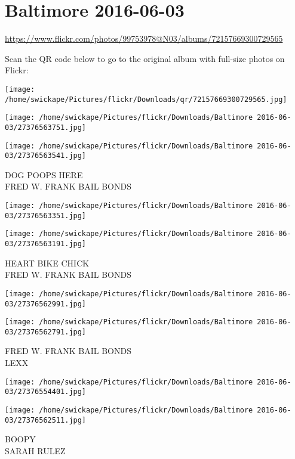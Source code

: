 \documentclass[10pt,letterpaper]{article}
\title{}
\author{}
\date{}
\begin{document}
\section*{Baltimore 2016-06-03}

\url{https://www.flickr.com/photos/99753978@N03/albums/72157669300729565}

Scan the QR code below to go to the original album with full-size photos on Flickr:

\texttt{[image: /home/swickape/Pictures/flickr/Downloads/qr/72157669300729565.jpg]}
\pagebreak

\texttt{[image: /home/swickape/Pictures/flickr/Downloads/Baltimore 2016-06-03/27376563751.jpg]}

\vspace{0.25in}
\texttt{[image: /home/swickape/Pictures/flickr/Downloads/Baltimore 2016-06-03/27376563541.jpg]}

DOG POOPS HERE\\
FRED W. FRANK BAIL BONDS
\pagebreak

\texttt{[image: /home/swickape/Pictures/flickr/Downloads/Baltimore 2016-06-03/27376563351.jpg]}

\vspace{0.25in}
\texttt{[image: /home/swickape/Pictures/flickr/Downloads/Baltimore 2016-06-03/27376563191.jpg]}

HEART BIKE CHICK\\
FRED W. FRANK BAIL BONDS
\pagebreak

\texttt{[image: /home/swickape/Pictures/flickr/Downloads/Baltimore 2016-06-03/27376562991.jpg]}

\vspace{0.25in}
\texttt{[image: /home/swickape/Pictures/flickr/Downloads/Baltimore 2016-06-03/27376562791.jpg]}

FRED W. FRANK BAIL BONDS\\
LEXX
\pagebreak

\texttt{[image: /home/swickape/Pictures/flickr/Downloads/Baltimore 2016-06-03/27376554401.jpg]}

\vspace{0.25in}
\texttt{[image: /home/swickape/Pictures/flickr/Downloads/Baltimore 2016-06-03/27376562511.jpg]}

BOOPY\\
SARAH RULEZ
\pagebreak
\end{document}
